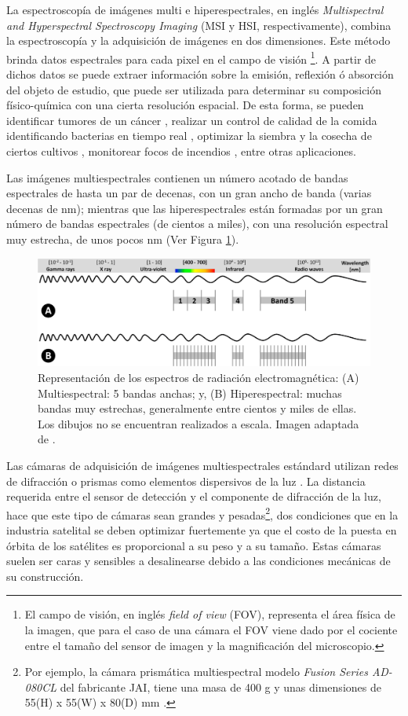 La espectroscopía de imágenes multi e hiperespectrales, en inglés \textit{Multispectral and Hyperspectral Spectroscopy
Imaging} (MSI y HSI, respectivamente), combina la espectroscopía y la adquisición de imágenes en dos dimensiones.
Este método brinda datos espectrales para cada pixel en el campo de visión \footnote{El campo de visión, en inglés \textit{field of view} (FOV), representa el área física de la imagen, que para el caso de una cámara el FOV viene dado por el cociente entre el tamaño del sensor de imagen y la magnificación del microscopio.}. A partir de
dichos datos se puede extraer información sobre la emisión, reflexión ó absorción del objeto de estudio, que puede ser utilizada para determinar su composición físico-química con una cierta
resolución espacial. De esta forma, se pueden identificar tumores de un cáncer \cite{canc}, realizar un
control de calidad de la comida identificando bacterias en tiempo real \cite{food}, optimizar la siembra y la cosecha de ciertos cultivos \cite{cultiv}, monitorear focos de incendios \cite{fire}, entre otras
aplicaciones.

Las imágenes multiespectrales contienen un número acotado de bandas espectrales 
de hasta un par de decenas, con un gran ancho de banda (varias decenas de nm); 
mientras que las hiperespectrales están formadas por un gran número de bandas 
espectrales (de cientos a miles), con una resolución espectral muy estrecha, de 
unos pocos nm (Ver Figura \ref{fig:spectrus}).


\begin{figure}[H]
	\centering
	\includegraphics[scale=0.2]{Figs/plan_de_tesis/multivshyper.png}
	\caption{ Representación de los espectros de radiación electromagnética: (A) Multiespectral: 5 
		bandas anchas; y, (B) Hiperespectral: muchas bandas muy estrechas, 
		generalmente entre cientos y miles de ellas. Los dibujos no se 
		encuentran 
		realizados a escala. Imagen adaptada de \cite{Adao2017}.}
	\label{fig:spectrus}
\end{figure}


Las cámaras de adquisición de imágenes multiespectrales estándard utilizan 
redes de difracción o prismas como elementos dispersivos de la luz \cite{5459162}. La 
distancia requerida entre el sensor de detección y el componente de difracción 
de la luz, hace que este tipo de cámaras sean grandes y pesadas\footnote{Por ejemplo, la cámara prismática multiespectral modelo \textit{Fusion Series AD-080CL} del fabricante JAI, tiene una masa de 400 g y unas dimensiones de 55(H) x 55(W) x 80(D) mm \cite{jaii}.}, dos condiciones que en la industria satelital se deben optimizar 
fuertemente ya que el costo de la puesta en órbita de los satélites es 
proporcional a su peso y a su tamaño. Estas cámaras suelen ser caras y 
sensibles a desalinearse debido a las condiciones mecánicas de su construcción. 

